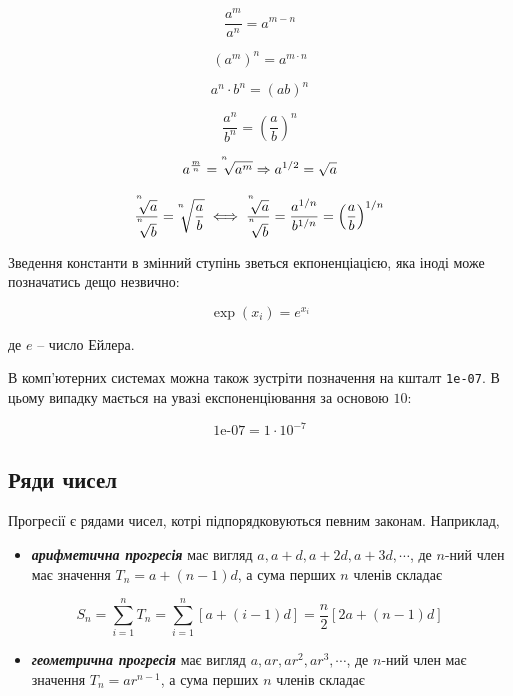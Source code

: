 \documentclass[
  11pt,
]{book}
\providecommand{\tightlist}{%
  \setlength{\itemsep}{0pt}\setlength{\parskip}{0pt}}
\begin{document}
\[\frac{a^m}{a^n} = a^{m-n}\]

\[(a^m)^n = a^{m \cdot n}\]

\[a^n \cdot b^n = (ab)^n\]

\[\frac{a^n}{b^n} = \left( \frac{a}{b}\right)^n\]

\[a^{\frac{m}{n}} = \sqrt[\leftroot{5} \uproot{10} n]{a^m} \Rightarrow a^{1/2} = \sqrt{a}\]

\[\frac{\sqrt[\leftroot{5} \uproot{10} n]{a}}{\sqrt[\leftroot{5} \uproot{10} n]{b}} = \sqrt[\leftroot{5} \uproot{10} n]{\frac{a}{b}} \iff \frac{\sqrt[\leftroot{5} \uproot{10} n]{a}}{\sqrt[\leftroot{5} \uproot{10} n]{b}} = \frac{a^{1/n}}{b^{1/n}} = \left( \frac{a}{b} \right)^{1/n}\]

Зведення константи в змінний ступінь зветься екпоненціацією, яка іноді може позначатись дещо незвично:

\[\exp (x_i) = e^{x_i}\]

де \(e\) -- число Ейлера.

В комп'ютерних системах можна також зустріти позначення на кшталт \texttt{1e-07}. В цьому випадку мається на увазі експоненціювання за основою \(10\):

\[\text{1e-07} = 1 \cdot 10^{-7}\]

\subsection{Ряди чисел}\label{ux440ux44fux434ux438-ux447ux438ux441ux435ux43b}

Прогресії є рядами чисел, котрі підпорядковуються певним законам. Наприклад,

\begin{itemize}
\tightlist
\item
  \textbf{\emph{арифметична прогресія}} має вигляд \(a, a+d, a+2d, a+3d, \cdots\), де \(n\)-ний член має значення \(T_n = a + (n-1)d\), а сума перших \(n\) членів складає
\end{itemize}

\[S_n = \sum\limits_{i=1}^n T_n = \sum\limits_{i=1}^n \left[ a + (i-1)d \right] = \frac{n}{2}[2a+(n-1)d]\]

\begin{itemize}
\tightlist
\item
  \textbf{\emph{геометрична прогресія}} має вигляд \(a, ar, ar^2, ar^3, \cdots\), де \(n\)-ний член має значення \(T_n = ar^{n-1}\), а сума перших \(n\) членів складає
\end{itemize}
\end{document}
